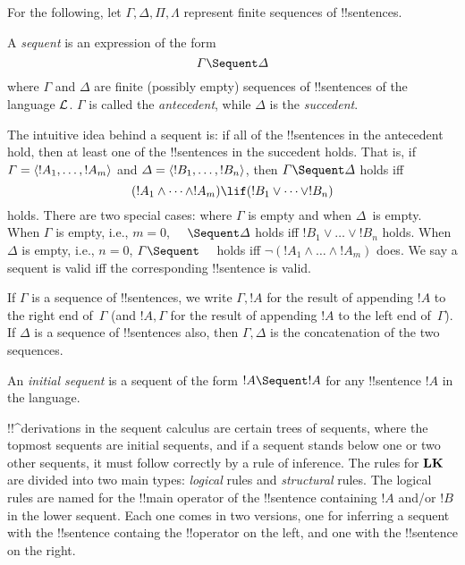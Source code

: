 \documentclass[../../../include/open-logic-section]{subfiles}
\begin{document}
      {}
      {}


For the following, let $\Gamma, \Delta, \Pi, \Lambda$ represent finite
sequences of !!{sentence}s.

\begin{defn}[Sequent]
A \emph{sequent} is an expression of the form
\[
\Gamma \Sequent \Delta
\]
where $\Gamma$ and $\Delta$ are finite (possibly empty) sequences of
!!{sentence}s of the language $\mathcal L$. $\Gamma$ is called the
\emph{antecedent}, while $\Delta$ is the \emph{succedent}.
\end{defn}

\begin{explain}
The intuitive idea behind a sequent is: if all of the !!{sentence}s in
the antecedent hold, then at least one of the !!{sentence}s in the
succedent holds. That is, if $\Gamma = \langle !A_1, \dots, !A_m \rangle$ and
$\Delta = \langle !B_1, \dots, !B_n \rangle$, then $\Gamma \Sequent \Delta$
holds iff
\[
(!A_1 \land \cdots \land !A_m) \lif (!B_1 \lor \cdots \lor
!B_n)
\]
holds. There are two special cases: where $\Gamma$ is empty and when
$\Delta$~is empty. When $\Gamma$ is empty, i.e., $m = 0$, $\quad
\Sequent \Delta$ holds iff $!B_1 \lor \dots \lor !B_n$ holds. When
$\Delta$ is empty, i.e., $n = 0$, $\Gamma \Sequent \quad$ holds iff
$\lnot(!A_1 \land \dots \land !A_m)$ does.  We say a sequent is valid
iff the corresponding !!{sentence} is valid.
\end{explain}

If $\Gamma$ is a sequence of !!{sentence}s, we write $\Gamma, !A$ for
the result of appending $!A$ to the right end of~$\Gamma$ (and $!A,
\Gamma$ for the result of appending $!A$ to the left end
of~$\Gamma$). If $\Delta$ is a sequence of !!{sentence}s also, then $\Gamma,
\Delta$ is the concatenation of the two sequences.

\begin{defn}
An \emph{initial sequent} is a sequent
{of the form $!A \Sequent !A$} for any !!{sentence} $!A$ in the language.
\end{defn}

!!^{derivation}s in the sequent calculus are certain trees of
sequents, where the topmost sequents are initial sequents, and if a
sequent stands below one or two other sequents, it must follow
correctly by a rule of inference.  The rules for $\mathbf{LK}$ are
divided into two main types: \emph{logical} rules and
\emph{structural} rules.  The logical rules are named for the !!{main
  operator} of the !!{sentence} containing $!A$ and/or $!B$ in the
lower sequent. Each one comes in two versions, one for inferring a
sequent with the !!{sentence} containg the !!{operator} on the left,
and one with the !!{sentence} on the right.
\end{document}
